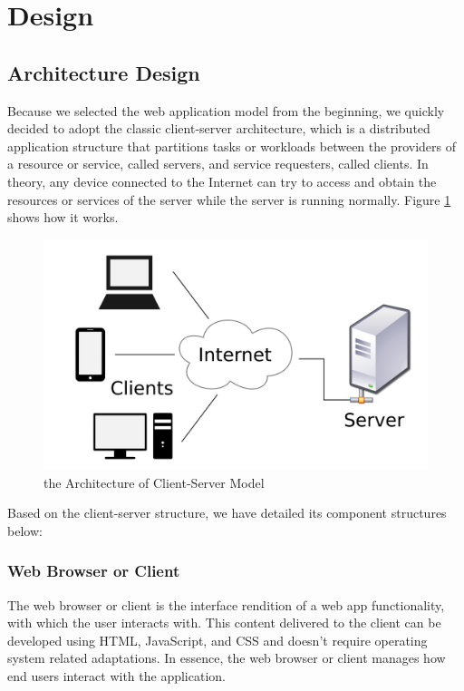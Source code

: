 \section{Design}
\label{sec:Design}

\subsection{Architecture Design}
Because we selected the web application model from the beginning, we quickly decided to adopt the classic client-server architecture, which is a distributed application structure that partitions tasks or workloads between the providers of a resource or service, called servers, and service requesters, called clients. In theory, any device connected to the Internet can try to access and obtain the resources or services of the server while the server is running normally. Figure \ref{Client-Server Architecture} shows how it works.

\begin{figure}[htb]
\centering
\includegraphics[width=\textwidth]{section03/assets/client_server.png}
\caption[the Architecture of Client-Server Model]{\label{Client-Server Architecture}the Architecture of Client-Server Model}
\end{figure}

Based on the client-server structure, we have detailed its component structures below:
\subsubsection{Web Browser or Client}
The web browser or client is the interface rendition of a web app functionality, with which the user interacts with. This content delivered to the client can be developed using HTML, JavaScript, and CSS and doesn’t require operating system related adaptations. In essence, the web browser or client manages how end users interact with the application.

